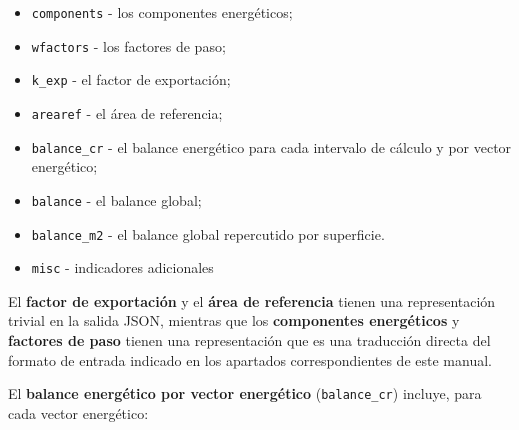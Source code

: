 \documentclass[10pt,notitlepage,oneside,a4paper]{article}
\begin{document}
\begin{itemize}
    \item \texttt{components} - los componentes energéticos;
    \item \texttt{wfactors} - los factores de paso;
    \item \texttt{k\_exp} - el factor de exportación;
    \item \texttt{arearef} - el área de referencia;
    \item \texttt{balance\_cr} - el balance energético para cada intervalo de cálculo y por vector energético;
    \item \texttt{balance} - el balance global;
    \item \texttt{balance\_m2} - el balance global repercutido por superficie.
    \item \texttt{misc} - indicadores adicionales
\end{itemize}

El \textbf{factor de exportación} y el \textbf{área de referencia} tienen una representación trivial en la salida JSON, mientras que los \textbf{componentes energéticos} y \textbf{factores de paso} tienen una representación que es una traducción directa del formato de entrada indicado en los apartados correspondientes de este manual.

El \textbf{balance energético por vector energético} (\texttt{balance\_cr}) incluye, para cada vector energético:
\end{document}

